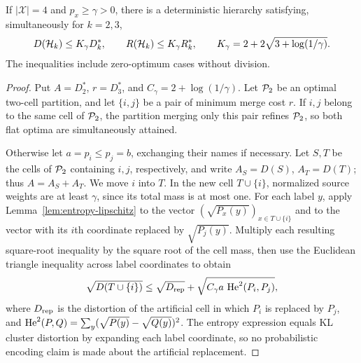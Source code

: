 \begin{theorem}
\label{thm:mass-bound}
If $|\mathcal X|=4$ and $p_x\ge\gamma>0$, there is a deterministic
hierarchy satisfying, simultaneously for $k=2,3$,
\begin{equation}
 D(\mathcal H_k)\le K_\gamma D_k^*,\qquad
 R(\mathcal H_k)\le K_\gamma R_k^*,\qquad
 K_\gamma=2+2\sqrt{3+\log(1/\gamma)}.
 \label{eq:mass-bound}
\end{equation}
The inequalities include zero-optimum cases without division.
\end{theorem}
\begin{proof}
Put $A=D_2^*$, $r=D_3^*$, and $C_\gamma=2+\log(1/\gamma)$.
Let $\mathcal P_2$ be an optimal two-cell partition, and let $\{i,j\}$ be a
pair of minimum merge cost $r$. If $i,j$ belong to the same cell of
$\mathcal P_2$, the partition merging only this pair refines $\mathcal P_2$, so both
flat optima are simultaneously attained.

Otherwise let $a=p_i\le p_j=b$, exchanging their names if necessary.
Let $S,T$ be the cells of $\mathcal P_2$ containing $i,j$, respectively, and
write $A_S=D(S)$, $A_T=D(T)$; thus $A=A_S+A_T$.
We move $i$ into $T$. In the new cell $T\cup\{i\}$, normalized source
weights are at least $\gamma$, since its total mass is at most one.
For each label $y$, apply Lemma~\ref{lem:entropy-lipschitz} to the vector
$(\sqrt{P_x(y)})_{x\in T\cup\{i\}}$ and to the vector with its
$i$th coordinate replaced by $\sqrt{P_j(y)}$. Multiply each resulting
square-root inequality by the square root of the cell mass, then use the
Euclidean triangle inequality across label coordinates to obtain
\begin{equation}
 \sqrt{D(T\cup\{i\})}
 \le\sqrt{D_{\rm rep}}+
      \sqrt{C_\gamma a\,\operatorname{He}^2(P_i,P_j)},
 \label{eq:one-sided-perturbation}
\end{equation}
where $D_{\rm rep}$ is the distortion of the artificial cell in which
$P_i$ is replaced by $P_j$, and
$\operatorname{He}^2(P,Q)=\sum_y(\sqrt{P(y)}-\sqrt{Q(y)})^2$.
The entropy expression equals KL cluster distortion by expanding each
label coordinate, so no probabilistic encoding claim is made about the
artificial replacement.


\end{proof}
